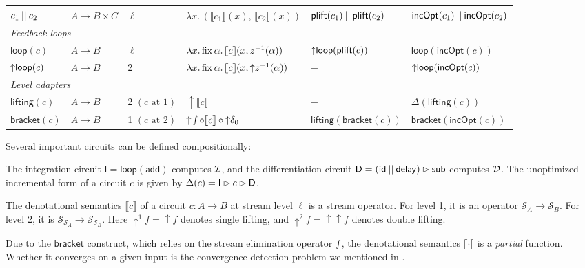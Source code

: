 \begin{table}[htb]
\begin{tabular}{llllll}
        $c_1 \mathbin{||} c_2$ & $A \to B \times C$ & $\ell$ & $\lambda x.\, (\llbracket c_1 \rrbracket(x),\, \llbracket c_2 \rrbracket(x))$ & $\mathsf{plift}(c_1) \mathbin{||} \mathsf{plift}(c_2)$ & $\mathsf{incOpt}(c_1) \mathbin{||} \mathsf{incOpt}(c_2)$ \\
        \midrule
        \multicolumn{6}{l}{\textit{Feedback loops}} \\
        $\mathsf{loop}(c)$ & $A \to B$ & $\ell$ & $\lambda x.\, \mathrm{fix}\, \alpha.\, \llbracket c \rrbracket(x, z^{-1}(\alpha))$ & $\mathsf{{\uparrow}loop}(\mathsf{plift}(c))$ & $\mathsf{loop}(\mathsf{incOpt}(c))$ \\
        $\mathsf{{\uparrow}loop}(c)$ & $A \to B$ & 2 & $\lambda x.\, \mathrm{fix}\, \alpha.\, \llbracket c \rrbracket(x, {\uparrow}z^{-1}(\alpha))$ & $-$ & $\mathsf{{\uparrow}loop}(\mathsf{incOpt}(c))$ \\
        \midrule
        \multicolumn{6}{l}{\textit{Level adapters}} \\
        $\mathsf{lifting}(c)$ & $A \to B$  & 2 $(c \text{ at } 1)$ & ${\uparrow}\llbracket c \rrbracket$ & $-$ & $\Delta(\mathsf{lifting}(c))$ \\
        $\mathsf{bracket}(c)$ & $A \to B$  & 1 $(c \text{ at } 2)$ & ${\uparrow}\smallint \circ \llbracket c \rrbracket \circ {\uparrow}\delta_0$ & $\mathsf{lifting}(\mathsf{bracket}(c))$ & $\mathsf{bracket}(\mathsf{incOpt}(c))$ \\
        \bottomrule
    \end{tabular}
\end{table}

Several important circuits can be defined compositionally: 
\begin{definition}
    The integration circuit $\mathsf{I} = \mathsf{loop}(\mathsf{add})$ computes $\mathcal{I}$, and the differentiation circuit $\mathsf{D} = (\mathsf{id} \mathbin{||} \mathsf{delay}) \mathbin{\vartriangleright} \mathsf{sub}$ computes $\mathcal{D}$. The unoptimized incremental form of a circuit $c$ is given by $\Delta(c) = \mathsf{I} \mathbin{\vartriangleright} c \mathbin{\vartriangleright} \mathsf{D}$.
\end{definition}

The denotational semantics $\llbracket c \rrbracket$ of a circuit $c : A \to B$ at stream level $\ell$ is a stream operator. For level 1, it is an operator $\mathcal{S}_A \to \mathcal{S}_B$. For level 2, it is $\mathcal{S}_{\mathcal{S}_A} \to \mathcal{S}_{\mathcal{S}_B}$. Here ${\uparrow}^{1} f = {\uparrow} f$ denotes single lifting, and ${\uparrow}^{2} f = {\uparrow}{\uparrow} f$ denotes double lifting.

Due to the $\mathsf{bracket}$ construct, which relies on the stream elimination operator $\smallint$, the denotational semantics $\llbracket \cdot \rrbracket$ is a \emph{partial} function. Whether it converges on a given input is the convergence detection problem we mentioned in .

